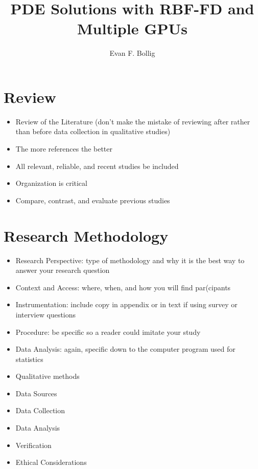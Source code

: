 \documentclass[11pt]{fsuthesis}
\title{PDE Solutions with RBF-FD and Multiple GPUs}
\author{Evan F. Bollig}
\begin{document}
%
%
%
%
%
%
%
%
%

\mainmatter



\chapter{Review}
\begin{itemize} 
	\item Review of the Literature (don’t make the mistake of reviewing after rather than before data collection in qualitative studies)
	\item The more references the better
	\item All relevant, reliable, and recent studies be included
	\item Organization is critical 
	\item Compare, contrast, and evaluate previous studies
\end{itemize}

\chapter{Research Methodology}
\begin{itemize} 
	\item Research Perspective: type of methodology and why it is the best way to answer your research question
	\item Context and Access: where, when, and how you will ﬁnd par(cipants 
 	\item Instrumentation: include copy in appendix or in text if using survey or interview questions
 	\item Procedure: be specific so a reader could imitate your study 
 	\item Data Analysis: again, specific down to the computer program used for statistics
 	\item Qualitative methods
 	\item Data Sources
 	\item Data Collection
 	\item Data Analysis
 	\item Verification
 	\item Ethical Considerations
\end{itemize} 
\end{document}
